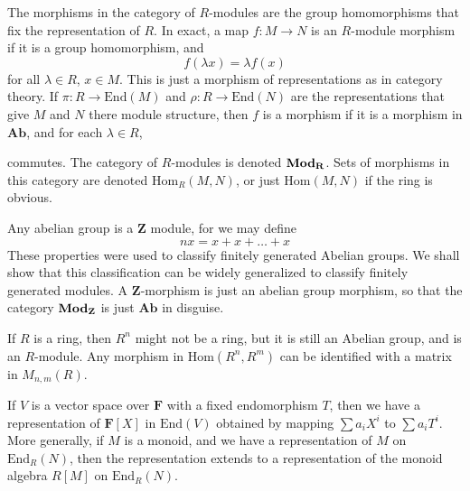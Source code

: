 The morphisms in the category of $R$-modules are the group homomorphisms that fix the representation of $R$. In exact, a map $f: M \to N$ is an $R$-module morphism if it is a group homomorphism, and
%
\[ f(\lambda x) = \lambda f(x) \]
%
for all $\lambda \in R$, $x \in M$. This is just a morphism of representations as in category theory. If $\pi: R \to \text{End}(M)$ and $\rho: R \to \text{End}(N)$ are the representations that give $M$ and $N$ there module structure, then $f$ is a morphism if it is a morphism in $\mathbf{Ab}$, and for each $\lambda \in R$,
%
\begin{center}
\end{center}
%
commutes. The category of $R$-modules is denoted $\text{{\bf Mod}}_\mathbf{R}$. Sets of morphisms in this category are denoted $\text{Hom}_R(M,N)$, or just $\text{Hom}(M,N)$ if the ring is obvious.

\begin{example}
    Any abelian group is a $\mathbf{Z}$ module, for we may define
    \[ nx = x + x + \dots + x \]
    These properties were used to classify finitely generated Abelian groups. We shall show that this classification can be widely generalized to classify finitely generated modules. A $\mathbf{Z}$-morphism is just an abelian group morphism, so that the category $\text{{\bf Mod}}_\mathbf{Z}$ is just $\mathbf{Ab}$ in disguise.
\end{example}

\begin{example}
    If $R$ is a ring, then $R^n$ might not be a ring, but it is still an Abelian group, and is an $R$-module. Any morphism in $\text{Hom}(R^n, R^m)$ can be identified with a matrix in $M_{n,m}(R)$.
\end{example}

\begin{example}
    If $V$ is a vector space over $\mathbf{F}$ with a fixed endomorphism $T$, then we have a representation of $\mathbf{F}[X]$ in $\text{End}(V)$ obtained by mapping $\sum a_i X^i$ to $\sum a_i T^i$. More generally, if $M$ is a monoid, and we have a representation of $M$ on $\text{End}_R(N)$, then the representation extends to a representation of the monoid algebra $R[M]$ on $\text{End}_R(N)$.
\end{example}


